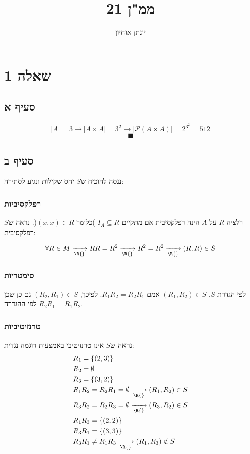 \documentclass[11pt, oneside]{article}
\title{ממ"ן 21}
\author{יונתן אוחיון}
\newcommand{\qed}{$$\blacksquare$$}
\newcommand{\opr}[1]{\xrightarrow[\text{\R{#1}}]{}}
\begin{document}
\maketitle

\section{שאלה 1}

\subsection{סעיף א}
$$|A| = 3 \rightarrow |A \times A| = 3^2 \rightarrow |\mathcal{P}(A \times A)| = 2^{3^2} = 512$$
\qed

\subsection{סעיף ב}
ננסה להוכיח ש$S$ יחס שקילות ונגיע לסתירה:
\subsubsection{רפלקסיביות}
רלציה $R$ על $A$ הינה רפלקסיבית אם מתקיים $I_A \subseteq R$ )כלומר $(x, x) \in R$(. נראה ש$S$ רפלקסיבית: 

$$\forall R \in M \opr{} RR = R^2 \opr{} R^2 = R^2 \opr{} (R, R) \in S$$

\subsubsection{סימטריות}
לפי הגדרת $S$, $(R_1, R_2) \in S$ אמם $R_1R_2 = R_2R_1$. לפיכך, $(R_2, R_1) \in S$ גם כן שכן $R_2R_1 = R_1R_2$ לפי ההגדרה.
\clearpage

\subsubsection{טרנזיטיביות}
נראה ש$S$ אינו טרנזיטיבי באמצעות דוגמה נגדית:
\begin{align*}
& R_1 = \{(2, 3)\}\\
& R_2 = \emptyset\\
& R_3 = \{(3,2)\}\\
& R_1R_2 = R_2R_1 = \emptyset \opr{} (R_1, R_2) \in S\\
& R_3R_2 = R_2R_3 = \emptyset \opr{} (R_3, R_2) \in S\\
& R_1R_3 = \{(2, 2)\}\\
& R_3R_1 = \{(3, 3)\}\\
& R_3R_1 \neq R_1R_3 \opr{} (R_1, R_3) \notin S
\end{align*}
\end{document}
